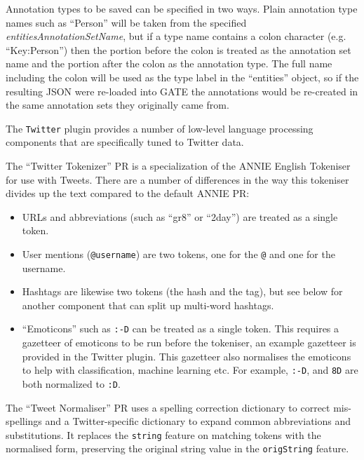 Annotation types to be saved can be specified in two ways.  Plain annotation
type names such as ``Person'' will be taken from the specified
\emph{entitiesAnnotationSetName}, but if a type name contains a colon character
(e.g. ``Key:Person'') then the portion before the colon is treated as the
annotation set name and the portion after the colon as the annotation type.
The full name including the colon will be used as the type label in the
``entities'' object, so if the resulting JSON were re-loaded into GATE the
annotations would be re-created in the same annotation sets they originally
came from.


The \verb!Twitter! plugin provides a number of low-level language processing
components that are specifically tuned to Twitter data.

The ``Twitter Tokenizer'' PR is a specialization of the ANNIE English Tokeniser
for use with Tweets.  There are a number of differences in the way this
tokeniser divides up the text compared to the default ANNIE PR:
%
\begin{itemize}
\item URLs and abbreviations (such as ``gr8'' or ``2day'') are treated as a
  single token.
\item User mentions (\verb!@username!) are two tokens, one for the \verb!@! and
  one for the username.
\item Hashtags are likewise two tokens (the hash and the tag), but see below
  for another component that can split up multi-word hashtags.
\item ``Emoticons'' such as \verb!:-D! can be treated as a single token.  This
  requires a gazetteer of emoticons to be run before the tokeniser, an example
  gazetteer is provided in the Twitter plugin. This gazetteer also normalises
  the emoticons to help with classification, machine learning etc. For example,
  \verb!:-D!, and \verb!8D! are both normalized to \verb!:D!.
\end{itemize}

The ``Tweet Normaliser'' PR uses a spelling correction dictionary to correct
mis-spellings and a Twitter-specific dictionary to expand common abbreviations
and substitutions.  It replaces the \verb!string! feature on matching tokens
with the normalised form, preserving the original string value in the
\verb!origString! feature.


